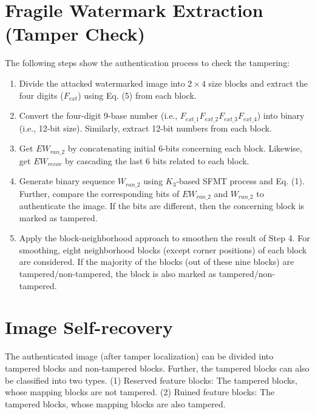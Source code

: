 \documentclass{article}
\begin{document}
\section{Fragile Watermark Extraction (Tamper Check)}

The following steps show the authentication process to check the tampering:

\begin{enumerate}
    \item Divide the attacked watermarked image into $2 \times 4$ size blocks and extract the four digits ($F_{ext}$) using Eq. (5) from each block.
    
    \item Convert the four-digit 9-base number (i.e., $F_{ext\_1}F_{ext\_2}F_{ext\_3}F_{ext\_4}$) into binary (i.e., 12-bit size). Similarly, extract 12-bit numbers from each block.
    
    \item Get $EW_{ran\_2}$ by concatenating initial 6-bits concerning each block. Likewise, get $EW_{recov}$ by cascading the last 6 bits related to each block.
    
    \item Generate binary sequence $W_{ran\_2}$ using $K_3$-based SFMT process and Eq. (1). Further, compare the corresponding bits of $EW_{ran\_2}$ and $W_{ran\_2}$ to authenticate the image. If the bits are different, then the concerning block is marked as tampered.
    
    \item Apply the block-neighborhood approach to smoothen the result of Step 4. For smoothing, eight neighborhood blocks (except corner positions) of each block are considered. If the majority of the blocks (out of these nine blocks) are tampered/non-tampered, the block is also marked as tampered/non-tampered.
\end{enumerate}

\section{Image Self-recovery}

The authenticated image (after tamper localization) can be divided into tampered blocks and non-tampered blocks. Further, the tampered blocks can also be classified into two types. (1) Reserved feature blocks: The tampered blocks, whose mapping blocks are not tampered. (2) Ruined feature blocks: The tampered blocks, whose mapping blocks are also tampered.
\end{document}
